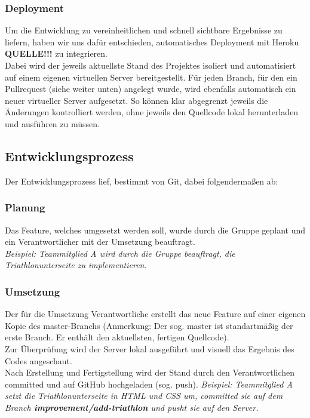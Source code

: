 \documentclass[12pt,a4paper]{article}
\begin{document}
\subsubsection{Deployment}
Um die Entwicklung zu vereinheitlichen und schnell sichtbare Ergebnisse zu liefern, haben wir uns dafür entschieden, automatisches Deployment mit Heroku \textbf{QUELLE!!!} zu integrieren.\\
Dabei wird der jeweils aktuellste Stand des Projektes isoliert und automatisiert auf einem eigenen virtuellen Server bereitgestellt. Für jeden Branch, für den ein Pullrequest (siehe weiter unten) angelegt wurde, wird ebenfalls automatisch ein neuer virtueller Server aufgesetzt. So können klar abgegrenzt jeweils die Änderungen kontrolliert werden, ohne jeweils den Quellcode lokal herunterladen und ausführen zu müssen.

\subsection{Entwicklungsprozess}
Der Entwicklungsprozess lief, bestimmt von Git, dabei folgendermaßen ab:
\subsubsection{Planung}
Das Feature, welches umgesetzt werden soll, wurde durch die Gruppe geplant und ein Verantwortlicher mit der Umsetzung beauftragt. \\
\emph{Beispiel: Teammitglied A wird durch die Gruppe beauftragt, die Triathlonunterseite zu implementieren.}
\subsubsection{Umsetzung}
Der für die Umsetzung Verantwortliche erstellt das neue Feature auf einer eigenen Kopie des master-Branchs (Anmerkung: Der sog. master ist standartmäßig der erste Branch. Er enthält den aktuellsten, fertigen Quellcode).\\
Zur Überprüfung wird der Server lokal ausgeführt und visuell das Ergebnis des Codes angeschaut.\\
Nach Erstellung und Fertigstellung wird der Stand durch den Verantwortlichen committed und auf GitHub hochgeladen (sog. push). 
\emph{Beispiel: Teammitglied A setzt die Triathlonunterseite in HTML und CSS um, committed sie auf dem Branch \textbf{improvement/add-triathlon} und pusht sie auf den Server.}
\end{document}
